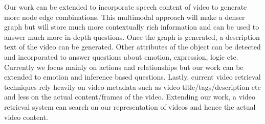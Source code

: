 \documentclass[sigconf]{acmart}
\begin{document}
Our work can be extended to incorporate speech content of video to
generate more node edge combinations. This multimodal approach will
make a denser graph but will store much more contextually rich
information and can be used to answer much more in-depth questions.
Once the graph is generated, a description text of the video can be
generated.  Other attributes of the object can be detected and
incorporated to answer questions about emotion, expression, logic
etc. Currently we focus mainly on actions and relationships but our
work can be extended to emotion and inference based questions.
Lastly, current video retrieval techniques rely heavily on video
metadata such as video title/tags/description etc and less on the
actual content/frames of the video. Extending our work, a video
retrieval system can search on our representation of videos and
hence the actual video content.





\end{document}
